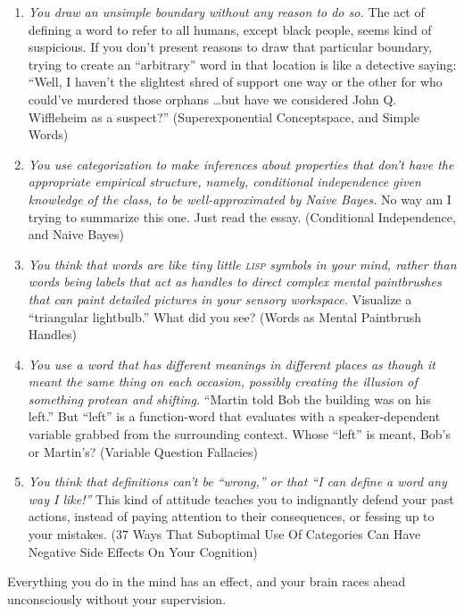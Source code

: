 \begin{enumerate}
\item {
 \textit{You draw an unsimple boundary without any reason to do
so.} The act of defining a word to refer to all humans, except black
people, seems kind of suspicious. If you don't present
reasons to draw that particular boundary, trying to create an
``arbitrary'' word in that location
is like a detective saying: ``Well, I
haven't the slightest shred of support one way or the
other for who could've murdered those orphans \ldots but
have we considered John Q. Wiffleheim as a suspect?''
(Superexponential Conceptspace, and Simple Words)}

\item {
 \textit{You use categorization to make inferences about properties
that don't have the appropriate empirical structure,
namely, conditional independence given knowledge of the class, to be
well-approximated by Naive Bayes.} No way am I trying to summarize this
one. Just read the essay. (Conditional Independence, and Naive Bayes)}

\item {
 \textit{You think that words are like tiny little \textsc{lisp} symbols in
your mind, rather than words being labels that act as handles to direct
complex mental paintbrushes that can paint detailed pictures in your
sensory workspace.} Visualize a ``triangular
lightbulb.'' What did you see? (Words as Mental
Paintbrush Handles)}

\item {
 \textit{You use a word that has different meanings in different
places as though it meant the same thing on each occasion, possibly
creating the illusion of something protean and shifting.}
``Martin told Bob the building was on his
left.'' But
``left'' is a function-word that
evaluates with a speaker-dependent variable grabbed from the
surrounding context. Whose ``left''
is meant, Bob's or Martin's? (Variable
Question Fallacies)}

\item {
 \textit{You think that definitions can't be
``wrong,'' or that
``I can define a word any way I
like!''} This kind of attitude teaches you to
indignantly defend your past actions, instead of paying attention to
their consequences, or fessing up to your mistakes. (37 Ways That
Suboptimal Use Of Categories Can Have Negative Side Effects On Your
Cognition)}
\end{enumerate}

{
 Everything you do in the mind has an effect, and your brain races
ahead unconsciously without your supervision.}

